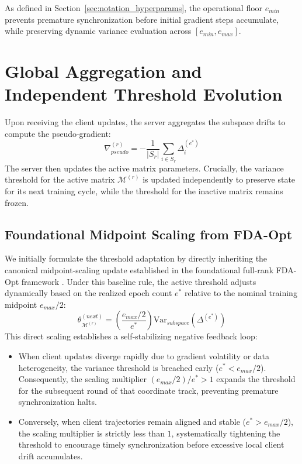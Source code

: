 As defined in Section~\ref{sec:notation_hyperparams}, the operational floor $e_{min}$ prevents premature synchronization before initial gradient steps accumulate, while preserving dynamic variance evaluation across $[e_{min}, e_{max}]$.

\section{Global Aggregation and Independent Threshold Evolution}
Upon receiving the client updates, the server aggregates the subspace drifts to compute the pseudo-gradient:
\begin{equation}
    \nabla_{pseudo}^{(r)} = - \frac{1}{|S_r|} \sum_{i \in S_r} \Delta_i^{(e^*)}
    \label{eq:pseudo_grad}
\end{equation}
The server then updates the active matrix parameters. Crucially, the variance threshold for the active matrix $\mathcal{M}^{(r)}$ is updated independently to preserve state for its next training cycle, while the threshold for the inactive matrix remains frozen.

\subsection{Foundational Midpoint Scaling from FDA-Opt}
\label{subsec:canonical_midpoint}
We initially formulate the threshold adaptation by directly inheriting the canonical midpoint-scaling update established in the foundational full-rank FDA-Opt framework \cite{theologitis2025fda}. Under this baseline rule, the active threshold adjusts dynamically based on the realized epoch count $e^*$ relative to the nominal training midpoint $e_{max}/2$:
\begin{equation}
    \theta_{\mathcal{M}^{(r)}}^{(next)} = \left( \frac{e_{max}/2}{e^*} \right) \text{Var}_{subspace}(\Delta^{(e^*)})
    \label{eq:std_update}
\end{equation}
This direct scaling establishes a self-stabilizing negative feedback loop:
\begin{itemize}
    \item When client updates diverge rapidly due to gradient volatility or data heterogeneity, the variance threshold is breached early ($e^* < e_{max}/2$). Consequently, the scaling multiplier $(e_{max}/2)/e^* > 1$ expands the threshold for the subsequent round of that coordinate track, preventing premature synchronization halts.
    \item Conversely, when client trajectories remain aligned and stable ($e^* > e_{max}/2$), the scaling multiplier is strictly less than $1$, systematically tightening the threshold to encourage timely synchronization before excessive local client drift accumulates.
\end{itemize}

